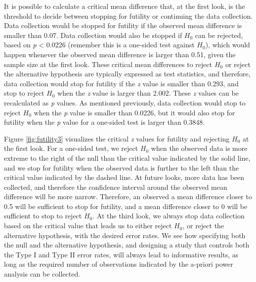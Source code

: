 \documentclass[
  english,
  ,man,floatsintext]{apa6}
\begin{document}
It is possible to calculate a critical mean difference that, at the first look, is the threshold to decide between stopping for futility or continuing the data collection. Data collection would be stopped for futility if the observed mean difference is smaller than 0.07. Data collection would also be stopped if \(H_0\) can be rejected, based on \emph{p} \textless{} 0.0226 (remember this is a one-sided test against \(H_0\)), which would happen whenever the observed mean difference is larger than 0.51, given the sample size at the first look. These critical mean differences to reject \(H_0\) or reject the alternative hypothesis are typically expressed as test statistics, and therefore, data collection would stop for futility if the \emph{z} value is smaller than 0.293, and stop to reject \(H_0\) when the \emph{z} value is larger than 2.002. These \emph{z} values can be recalculated as \emph{p} values. As mentioned previously, data collection would stop to reject \(H_0\) when the \emph{p} value is smaller than 0.0226, but it would also stop for futility when the \emph{p} value for a one-sided test is larger than 0.3848.

Figure \ref{fig:futility3} visualizes the critical \emph{z} values for futility and rejecting \(H_0\) at the first look. For a one-sided test, we reject \(H_0\) when the observed data is more extreme to the right of the null than the critical value indicated by the solid line, and we stop for futility when the observed data is further to the left than the critical value indicated by the dashed line. At future looks, more data has been collected, and therefore the confidence interval around the observed mean difference will be more narrow. Therefore, an observed a mean difference closer to 0.5 will be sufficient to stop for futility, and a mean difference closer to 0 will be sufficient to stop to reject \(H_0\). At the third look, we always stop data collection based on the critical value that leads us to either reject \(H_0\), or reject the alternative hypothesis, with the desired error rates. We see how specifying both the null and the alternative hypothesis, and designing a study that controls both the Type I and Type II error rates, will always lead to informative results, as long as the required number of observations indicated by the a-priori power analysis can be collected.
\end{document}
